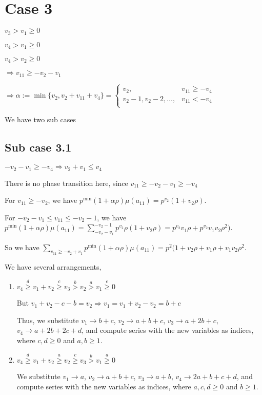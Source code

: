 \documentclass{article}
\begin{document}
\section{Case 3}
$v_3>v_1\geq{0}$

$v_4>v_1\geq{0}$

$v_4>v_2\geq{0}$

$\Rightarrow{v_{11}}\geq{-v_2-v_1}$

$\Rightarrow\alpha:=\min\{v_2,v_2+v_{11}+v_4\}=\begin{cases}
       v_2, & v_{11}\geq{-v_4}\\
       v_2-1,v_2-2,\dots, & v_{11}<{-v_4}\\
     \end{cases}$

We have two sub cases

\subsection{Sub case 3.1}
$-v_2-v_1\geq{-v_4}\Rightarrow{v_2+v_1\leq{v_4}}$

There is no phase transition here, since $v_{11}\geq{-v_2-v_1}\geq{-v_4}$

For $v_{11}\geq{-v_2}$, we have $p^{\min}(1+\alpha\rho)\mu(a_{11})=p^{v_2}(1+v_2\rho)$.

For $-v_2-v_1\leq{v_{11}}\leq{-v_2-1}$, we have $p^{\min}(1+\alpha\rho)\mu(a_{11})=\sum_{-v_2-v_1}^{-v_2-1}p^{v_2}\rho(1+v_2\rho)=p^{v_2}v_1\rho+p^{v_2}v_1v_2\rho^2)$.

So we have $\sum_{v_{11}\geq{-v_2+v_1}}p^{\min}(1+\alpha\rho)\mu(a_{11})=p^{2}(1+v_2\rho+v_1\rho+v_1v_2\rho^2.$

We have several arrangements,

\begin{enumerate}
\item 
$v_4\overset{d}{\geq}v_1+v_2\overset{c}{\geq}v_3\overset{b}{>}{v_2}\overset{a}{>}v_1\overset{e}{\geq}{0}$

But $v_1+v_2-c-b=v_2\Rightarrow{v_1=v_1+v_2-v_2=b+c}$

Thus, we substitute $v_1\rightarrow{b+c}$, $v_2\rightarrow{a+b+c}$, $v_3\rightarrow{a+2b+c}$, $v_4\rightarrow{a+2b+2c+d}$, and compute series with the new variables as indices, where $c,d\geq{0}$ and $a,b\geq{1}$.
\item 
$v_4\overset{d}{\geq}v_1+v_2\overset{a}{\geq}v_2\overset{c}{\geq}{v_3}\overset{b}{>}v_1\overset{a}{\geq}{0}$

We substitute $v_1\rightarrow{a}$, $v_2\rightarrow{a+b+c}$, $v_3\rightarrow{a+b}$, $v_4\rightarrow{2a+b+c+d}$, and compute series with the new variables as indices, where $a,c,d\geq{0}$ and $b\geq{1}$.

\end{enumerate}
\end{document}
